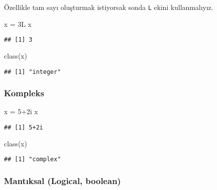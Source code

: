 \documentclass[
]{book}
\newenvironment{Shaded}{\begin{snugshade}}{\end{snugshade}}
\newcommand{\DecValTok}[1]{\textcolor[rgb]{0.00,0.00,0.81}{#1}}
\newcommand{\FunctionTok}[1]{\textcolor[rgb]{0.00,0.00,0.00}{#1}}
\newcommand{\NormalTok}[1]{#1}
\newcommand{\OtherTok}[1]{\textcolor[rgb]{0.56,0.35,0.01}{#1}}
\newcommand{\SpecialCharTok}[1]{\textcolor[rgb]{0.00,0.00,0.00}{#1}}
\begin{document}
Özellikle tam sayı oluşturmak istiyorsak sonda \texttt{L} ekini kullanmalıyız.

\begin{Shaded}
\begin{Highlighting}[]
\NormalTok{x }\OtherTok{=}\NormalTok{ 3L}
\NormalTok{x}
\end{Highlighting}
\end{Shaded}

\begin{verbatim}
## [1] 3
\end{verbatim}

\begin{Shaded}
\begin{Highlighting}[]
\FunctionTok{class}\NormalTok{(x)}
\end{Highlighting}
\end{Shaded}

\begin{verbatim}
## [1] "integer"
\end{verbatim}

\hypertarget{kompleks}{%
\subsubsection{Kompleks}\label{kompleks}}

\begin{Shaded}
\begin{Highlighting}[]
\NormalTok{x }\OtherTok{=} \DecValTok{5}\SpecialCharTok{+}\NormalTok{2i}
\NormalTok{x}
\end{Highlighting}
\end{Shaded}

\begin{verbatim}
## [1] 5+2i
\end{verbatim}

\begin{Shaded}
\begin{Highlighting}[]
\FunctionTok{class}\NormalTok{(x)}
\end{Highlighting}
\end{Shaded}

\begin{verbatim}
## [1] "complex"
\end{verbatim}

\hypertarget{mantux131ksal-logical-boolean}{%
\subsubsection{Mantıksal (Logical, boolean)}\label{mantux131ksal-logical-boolean}}
\end{document}
